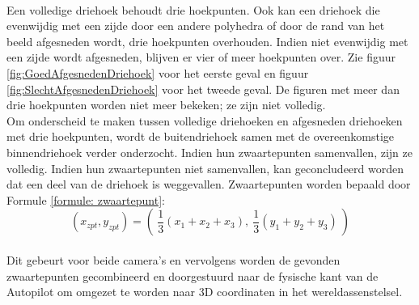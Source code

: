 \\
Een volledige driehoek behoudt drie hoekpunten. Ook kan een driehoek die evenwijdig met een zijde door een andere polyhedra of door de rand van het beeld afgesneden wordt, drie hoekpunten overhouden. Indien niet evenwijdig met een zijde wordt afgesneden, blijven er vier of meer hoekpunten over. Zie figuur \ref{fig:GoedAfgesnedenDriehoek} voor het eerste geval en figuur \ref{fig:SlechtAfgesnedenDriehoek} voor het tweede geval. De figuren met meer dan drie hoekpunten worden niet meer bekeken; ze zijn niet volledig.
\\
Om onderscheid te maken tussen volledige driehoeken en afgesneden driehoeken met drie hoekpunten, wordt de buitendriehoek samen met de overeenkomstige binnendriehoek verder onderzocht. Indien hun zwaartepunten samenvallen, zijn ze volledig. Indien hun zwaartepunten niet samenvallen, kan geconcludeerd worden dat een deel van de driehoek is weggevallen. Zwaartepunten worden bepaald door Formule \ref{formule: zwaartepunt}: \begin{equation}
\label{formule: zwaartepunt}
(x_{zpt},y_{zpt}) = ( \ \frac{1}{3}(x_1 + x_2 + x_3) , \ \frac{1}{3}(y_1 + y_2 + y_3) \ )
\end{equation}
\\
Dit gebeurt voor beide camera's en vervolgens worden de gevonden zwaartepunten gecombineerd en doorgestuurd naar de fysische kant van de Autopilot om omgezet te worden naar 3D coordinaten in het wereldassenstelsel.
\\
